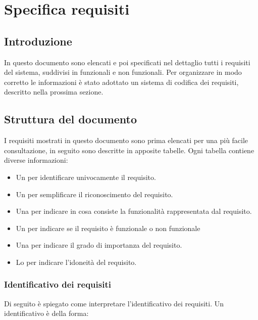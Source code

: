 \chapter{Specifica requisiti} 
\label{cha:specifica_requisiti}

\section{Introduzione} 
In questo documento sono elencati e poi specificati nel dettaglio tutti i requisiti del sistema, suddivisi in funzionali e non funzionali.
Per organizzare in modo corretto le informazioni è stato adottato un sistema di codifica dei requisiti, descritto nella prossima sezione.

\section{Struttura del documento}
\label{sec:struttura_del_documento}

I requisiti mostrati in questo documento sono prima elencati per una più facile consultazione, in seguito sono descritte in apposite tabelle. 
Ogni tabella contiene diverse informazioni:
\begin{itemize}
	\item Un  per identificare univocamente il requisito.
	\item Un  per semplificare il riconoscimento del requisito.
	\item Una  per indicare in cosa consiste la funzionalità rappresentata dal requisito.
	\item Un  per indicare se il requisito è funzionale o non funzionale
	\item Una  per indicare il grado di importanza del requisito.
	\item Lo  per indicare l'idoneità del requisito.
\end{itemize}

\subsection{Identificativo dei requisiti}
\label{subsec:identificativo_dei_requisiti}

Di seguito è spiegato come interpretare l'identificativo dei requisiti.
Un identificativo è della forma:
\begin{center}
\end{center}

